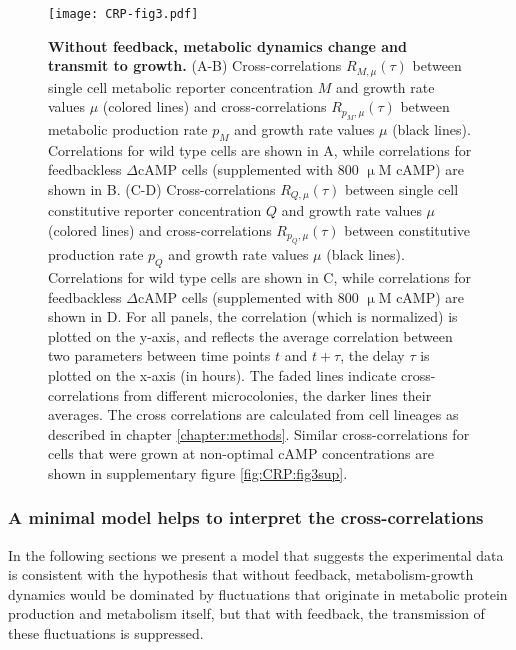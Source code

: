 \begin{figure}
	\centering
	\texttt{[image: CRP-fig3.pdf]}
	\caption{ 
		\textbf{Without feedback, metabolic dynamics change and transmit to growth.}
		(A-B) Cross-correlations $R_{M,\mu}(\tau)$ between single cell metabolic reporter concentration $M$ and growth rate values $\mu$ (colored lines) and 
		cross-correlations $R_{p_M,\mu}(\tau)$ between metabolic production rate $p_M$ and growth rate values $\mu$ (black lines). 
		Correlations for wild type cells are shown in A, while correlations for feedbackless $\Delta$cAMP cells (supplemented with 800 $\upmu$M cAMP) are shown in B.
		(C-D) Cross-correlations $R_{Q,\mu}(\tau)$ between single cell constitutive reporter concentration $Q$ and growth rate values $\mu$ (colored lines) and 
		cross-correlations $R_{p_Q,\mu}(\tau)$ between constitutive production rate $p_Q$ and growth rate values $\mu$ (black lines). 
		Correlations for wild type cells are shown in C, while correlations for feedbackless $\Delta$cAMP cells (supplemented with 800 $\upmu$M cAMP) are shown in D.
		For all panels, the correlation (which is normalized) is plotted on the y-axis, and reflects the average correlation between two parameters between time points $t$ and $t+\tau$, 
		the delay $\tau$ is plotted on the x-axis (in hours). The faded lines indicate cross-correlations from different microcolonies, the darker lines their averages. The cross correlations are calculated from cell lineages as described in chapter \ref{chapter:methods}.
		Similar cross-correlations for cells that were grown at non-optimal cAMP concentrations are shown in supplementary figure \ref{fig:CRP:fig3sup}.
	}
	\label{fig:CRP:fig3}
\end{figure}


\subsubsection*{A minimal model helps to interpret the cross-correlations}

In the following sections we present a model that suggests the experimental data is consistent with the hypothesis 
that without feedback, metabolism-growth dynamics would be dominated by fluctuations that originate in metabolic protein production and metabolism itself,
but that with feedback, the transmission of these fluctuations is suppressed.

